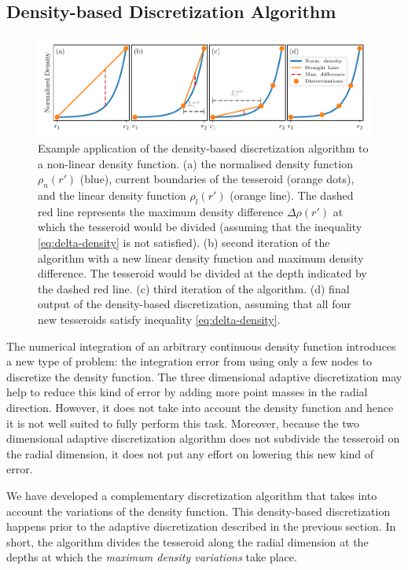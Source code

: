 \documentclass[extra, referee]{gji}
\begin{document}
\subsection{Density-based Discretization Algorithm}

\begin{figure}
\centering
\includegraphics[width=\linewidth]
    {figures/density-based-discretization-algorithm.pdf}
\caption{
    Example application of the density-based discretization algorithm to a non-linear
    density function.
    (a) the normalised density function $\rho_n(r')$ (blue), current boundaries of the
    tesseroid (orange dots), and the linear density function $\rho_l(r')$ (orange line).
    The dashed red line represents the maximum density difference $\Delta \rho (r')$ at
    which the tesseroid would be divided (assuming that the inequality
    \ref{eq:delta-density} is not satisfied).
    (b) second iteration of the algorithm with a new linear density function and maximum
    density difference. The tesseroid would be divided at the depth indicated by the
    dashed red line.
    (c) third iteration of the algorithm.
    (d) final output of the density-based discretization, assuming that all four new
    tesseroids satisfy inequality \ref{eq:delta-density}.
}
\label{fig:density-discretization-algorithm}
\end{figure}

The numerical integration of an arbitrary continuous density function introduces
a new type of problem:
the integration error from using only a few nodes to discretize the density function.
The three dimensional adaptive discretization may help
to reduce this kind of error by adding more point masses in the radial direction.
However, it does not take into account the density function
and hence it is not well suited to fully perform this task.
Moreover, because the two dimensional adaptive discretization algorithm does not
subdivide the tesseroid on the radial dimension, it does not put any effort on lowering
this new kind of error.

We have developed a complementary discretization
algorithm that takes into account the variations of the density function.
This density-based discretization happens prior to the adaptive discretization described
in the previous section.
In short, the algorithm divides the tesseroid along the radial dimension at the
depths at which the \emph{maximum density variations} take place.
\end{document}
